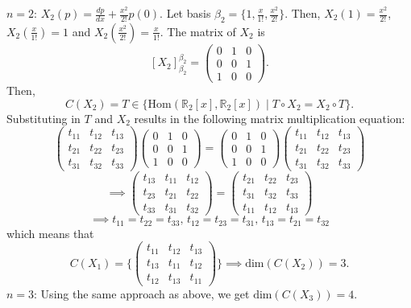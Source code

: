 \documentclass{article}
\begin{document}
\begin{itemize}
	      $\boxed{n=2}$: $X_2(p)=\frac{dp}{dx}+\frac{x^2}{2!}p(0)$. Let basis $\beta_2=\{1,\frac{x}{1!},\frac{x^2}{2!}\}$. Then, $X_2(1)=\frac{x^2}{2!}$, $X_2(\frac{x}{1!})=1$ and $X_2(\frac{x^2}{2!})=\frac{x}{1!}$. The matrix of $X_2$ is \[[X_2]_{\beta_2}^{\beta_2}=\begin{pmatrix}0&1&0\\0&0&1\\1&0&0\end{pmatrix}.\]Then,\[C(X_2)=T\in\{\text{Hom}(\mathbb{R}_2[x],\mathbb{R}_2[x])\mid T\circ X_2=X_2\circ T\}.\]Substituting in $T$ and $X_2$ results in the following matrix multiplication equation: \[\begin{pmatrix}t_{11}&t_{12}&t_{13}\\t_{21}&t_{22}&t_{23}\\t_{31}&t_{32}&t_{33}\end{pmatrix}\begin{pmatrix}0&1&0\\0&0&1\\1&0&0\end{pmatrix}=\begin{pmatrix}0&1&0\\0&0&1\\1&0&0\end{pmatrix}\begin{pmatrix}t_{11}&t_{12}&t_{13}\\t_{21}&t_{22}&t_{23}\\t_{31}&t_{32}&t_{33}\end{pmatrix}\]\[\implies\begin{pmatrix}t_{13}&t_{11}&t_{12}\\t_{23}&t_{21}&t_{22}\\t_{33}&t_{31}&t_{32}\end{pmatrix}=\begin{pmatrix}t_{21}&t_{22}&t_{23}\\t_{31}&t_{32}&t_{33}\\t_{11}&t_{12}&t_{13}\end{pmatrix}\]\[\implies t_{11}=t_{22}=t_{33}\text{, }t_{12}=t_{23}=t_{31}\text{, }t_{13}=t_{21}=t_{32}\] which means that\[C(X_1)=\{\begin{pmatrix}t_{11}&t_{12}&t_{13}\\t_{13}&t_{11}&t_{12}\\t_{12}&t_{13}&t_{11}\end{pmatrix}\}\implies \text{dim}(C(X_2))=3.\]
	      $\boxed{n=3}$: Using the same approach as above, we get $\text{dim}(C(X_3))=4$.\\

\end{itemize}
\end{document}
